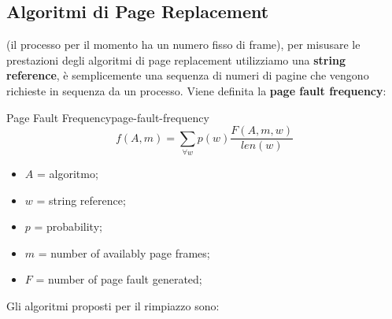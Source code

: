 \documentclass[12pt]{article}
\begin{document}
\subsection{Algoritmi di Page Replacement}
(il processo per il momento ha un numero fisso di frame), per misusare le prestazioni degli algoritmi di page replacement utilizziamo una \textbf{string reference}, \`e semplicemente una sequenza di numeri di pagine che vengono richieste in sequenza da un processo. Viene definita la \textbf{page fault frequency}:
\begin{definition}{Page Fault Frequency}{page-fault-frequency}
  \[ f(A,m) = \sum_{\forall w}^{} p(w) \frac{F(A,m,w)}{len(w)}  \]
  \begin{itemize}
    \item $A$ = algoritmo;
    \item $w$ = string reference;
    \item $p$ = probability;
    \item $m$ = number of availably page frames;
    \item $F$ = number of page fault generated;
  \end{itemize}
\end{definition}
Gli algoritmi proposti per il rimpiazzo sono:
\end{document}
